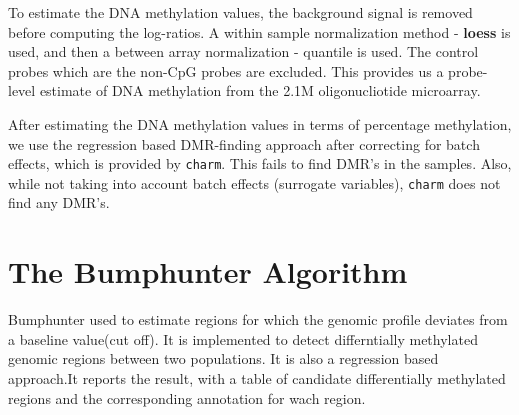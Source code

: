 \documentclass[11pt]{article}
\begin{document}
To estimate the DNA methylation values, the background signal is removed before computing the log-ratios. A within sample normalization method - {\bf loess} is used, and then a between array normalization - quantile  is used. The control probes which are the non-CpG probes are excluded. This provides us a probe-level estimate of DNA methylation from the 2.1M oligonucliotide microarray.

After estimating the DNA methylation values in terms of percentage methylation, we use the regression based DMR-finding approach after correcting for batch effects, which is provided by {\tt charm}. This fails to find DMR’s in the samples. Also, while not taking into account batch effects (surrogate variables), {\tt charm} does not find any DMR's. 



\section*{The Bumphunter Algorithm}


Bumphunter used to estimate regions for which the genomic profile deviates from a baseline value(cut off). It is implemented to detect differntially methylated genomic regions between two populations. It is also a regression based approach.It reports the result, with a table of candidate differentially methylated regions and the corresponding annotation for wach region.

%
%
%
%
%
%
%
%
%
%
%
%
%
\end{document}
